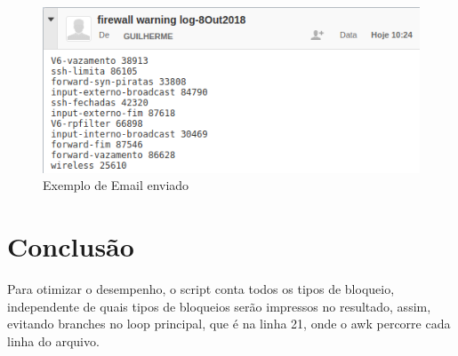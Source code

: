 \documentclass[oneside, 11 pt]{article}
\begin{document}
	\begin{figure}[h]
		\includegraphics[width=\linewidth]{mail.png}
		\caption{Exemplo de Email enviado}
		\label{fig:mail}
	\end{figure}
	
	\section{Conclusão}
	Para otimizar o desempenho, o script conta todos os tipos de bloqueio, independente de quais tipos de bloqueios serão impressos no resultado, assim, evitando branches no loop principal, que é na linha 21, onde o awk percorre cada linha do arquivo.
	

\end{document}
